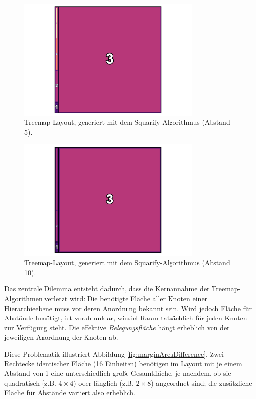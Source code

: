 \begin{figure}
    \centering
    \includegraphics[width=0.8\textwidth]{images/fiveMarginArtifialMap.png}
    \caption{Treemap-Layout, generiert mit dem Squarify-Algorithmus (Abstand 5).}
    \label{fig:fiveMarginArtificialMap}
\end{figure}

\begin{figure}
    \centering
    \includegraphics[width=0.8\textwidth]{images/tenMarginArtifialMap.png}
    \caption{Treemap-Layout, generiert mit dem Squarify-Algorithmus (Abstand 10).}
    \label{fig:tenMarginArtificialMap}
\end{figure}

Das zentrale Dilemma entsteht dadurch, dass die Kernannahme der Treemap-Algorithmen verletzt wird: Die benötigte Fläche aller Knoten einer Hierarchieebene muss vor deren Anordnung bekannt sein. Wird jedoch Fläche für Abstände benötigt, ist vorab unklar, wieviel Raum tatsächlich für jeden Knoten zur Verfügung steht. Die effektive \textit{Belegungsfläche} hängt erheblich von der jeweiligen Anordnung der Knoten ab.

Diese Problematik illustriert Abbildung \ref{fig:marginAreaDifference}. Zwei Rechtecke identischer Fläche (16 Einheiten) benötigen im Layout mit je einem Abstand von 1 eine unterschiedlich große Gesamtfläche, je nachdem, ob sie quadratisch (z.B. $4 \times 4$) oder länglich (z.B. $2 \times 8$) angeordnet sind; die zusätzliche Fläche für Abstände variiert also erheblich.

